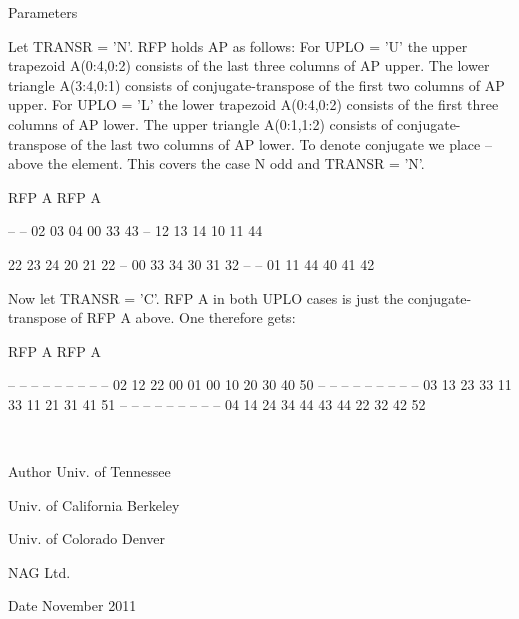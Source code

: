 \begin{DoxyParams}[1]{Parameters}
\begin{DoxyVerb}
  Let TRANSR = 'N'. RFP holds AP as follows:
  For UPLO = 'U' the upper trapezoid A(0:4,0:2) consists of the last
  three columns of AP upper. The lower triangle A(3:4,0:1) consists of
  conjugate-transpose of the first two   columns of AP upper.
  For UPLO = 'L' the lower trapezoid A(0:4,0:2) consists of the first
  three columns of AP lower. The upper triangle A(0:1,1:2) consists of
  conjugate-transpose of the last two   columns of AP lower.
  To denote conjugate we place -- above the element. This covers the
  case N odd  and TRANSR = 'N'.

         RFP A                   RFP A

                                   -- --
        02 03 04                00 33 43
                                      --
        12 13 14                10 11 44

        22 23 24                20 21 22
        --
        00 33 34                30 31 32
        -- --
        01 11 44                40 41 42

  Now let TRANSR = 'C'. RFP A in both UPLO cases is just the conjugate-
  transpose of RFP A above. One therefore gets:

           RFP A                   RFP A

     -- -- --                   -- -- -- -- -- --
     02 12 22 00 01             00 10 20 30 40 50
     -- -- -- --                   -- -- -- -- --
     03 13 23 33 11             33 11 21 31 41 51
     -- -- -- -- --                   -- -- -- --
     04 14 24 34 44             43 44 22 32 42 52\end{DoxyVerb}
 \\
\hline
\end{DoxyParams}
\begin{DoxyAuthor}{Author}
Univ. of Tennessee 

Univ. of California Berkeley 

Univ. of Colorado Denver 

N\+A\+G Ltd. 
\end{DoxyAuthor}
\begin{DoxyDate}{Date}
November 2011 
\end{DoxyDate}
